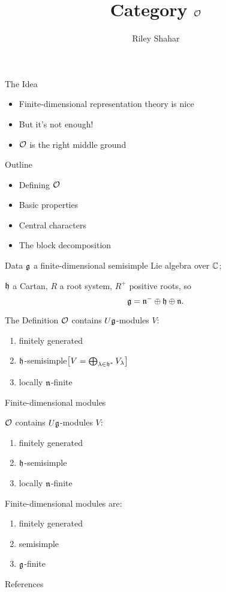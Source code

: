 \documentclass{beamer}
\title{Category $\mathcal{O}$}
\author{Riley Shahar}
\date{}
\begin{document}
\maketitle

\begin{frame}{The Idea}
	\pause
	\begin{itemize}
		\item Finite-dimensional representation theory is nice\pause
		\item But it's not enough!\pause
		\item $\mathcal{O}$ is the right middle ground
	\end{itemize}
\end{frame}

\begin{frame}{Outline}
	\begin{itemize}
		\item Defining $\mathcal{O}$
		\item Basic properties
		\item Central characters
		\item The block decomposition
	\end{itemize}
\end{frame}

\begin{frame}{Data}
	$\mathfrak{g}$ a finite-dimensional semisimple Lie algebra over $\mathbb{C}$;\pause

	$\mathfrak{h}$ a Cartan, $R$ a root system, $R^+$ positive roots, so\pause
	\[\mathfrak{g} = \mathfrak{n}^-\oplus\mathfrak{h}\oplus\mathfrak{n}.\]
\end{frame}

\begin{frame}{The Definition}
	$\mathcal{O}$ contains $U\mathfrak{g}$-modules $V$:\pause
	\begin{enumerate}
		\item finitely generated\pause
		\item $\mathfrak{h}$-semisimple\pause\hfill$\big[V =
				      \bigoplus_{\lambda\in\mathfrak{h}^*} V_\lambda\big]\hspace{3em}$\pause
		\item locally $\mathfrak{n}$-finite
	\end{enumerate}
\end{frame}

\begin{frame}{Finite-dimensional modules}
	\begin{multicols}{2}
		$\mathcal{O}$ contains $U\mathfrak{g}$-modules $V$:
		\begin{enumerate}
			\item finitely generated
			\item $\mathfrak{h}$-semisimple
			\item locally $\mathfrak{n}$-finite
		\end{enumerate}
		Finite-dimensional modules are:\pause
		\begin{enumerate}
			\item finitely generated\pause
			\item semisimple\pause
			\item $\mathfrak{g}$-finite
		\end{enumerate}
	\end{multicols}
\end{frame}

\begin{frame}[allowframebreaks]{References}
	\nocite{*}
	\printbibliography[heading=none,omitnumbers=true]
\end{frame}
\end{document}
